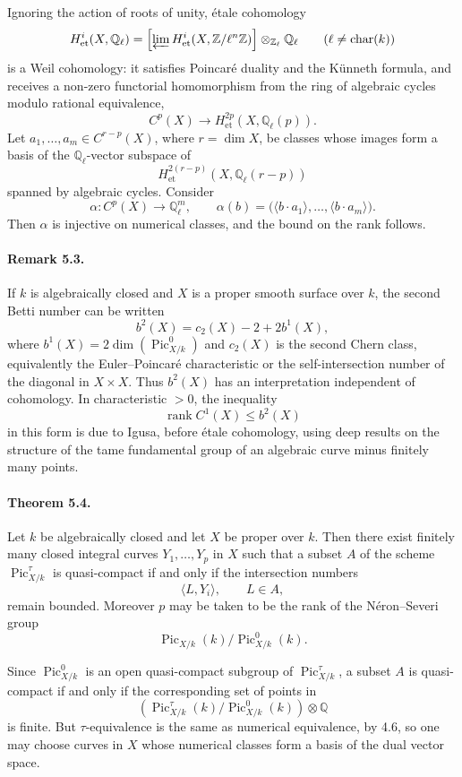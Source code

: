 \documentclass[11pt]{article}
\theoremstyle{plain}
\theoremstyle{definition}
\theoremstyle{remark}
\newcommand{\QQ}{\mathbb Q}
\newcommand{\ZZ}{\mathbb Z}
\DeclareMathOperator{\Pic}{Pic}
\DeclareMathOperator{\rank}{rank}
\newcommand{\longto}{\longrightarrow}
\providecommand{\car}{\operatorname{char}}
\begin{document}
Ignoring the action of roots of unity, étale cohomology
\[
H^i_{\mathrm{et}}(X,\QQ_\ell)=
\left[\varprojlim H^i_{\mathrm{et}}(X,\ZZ/\ell^n\ZZ)\right]\otimes_{\ZZ_\ell}\QQ_\ell
\qquad (\ell\neq\car(k))
\]
is a Weil cohomology: it satisfies Poincaré duality and the Künneth formula, and receives a non-zero functorial homomorphism from the ring of algebraic cycles modulo rational equivalence,
\[
C^p(X)\longto H^{2p}_{\mathrm{et}}(X,\QQ_\ell(p)).
\]
Let $a_1,\ldots,a_m\in C^{r-p}(X)$, where $r=\dim X$, be classes whose images form a basis of the $\QQ_\ell$-vector subspace of
\[
H^{2(r-p)}_{\mathrm{et}}(X,\QQ_\ell(r-p))
\]
spanned by algebraic cycles. Consider
\[
\alpha:C^p(X)\longto \QQ_\ell^m,\qquad
\alpha(b)=\bigl(\langle b\cdot a_1\rangle,\ldots,\langle b\cdot a_m\rangle\bigr).
\]
Then $\alpha$ is injective on numerical classes, and the bound on the rank follows.

\paragraph{Remark 5.3.}
If $k$ is algebraically closed and $X$ is a proper smooth surface over $k$, the second Betti number can be written
\[
b^2(X)=c_2(X)-2+2b^1(X),
\]
where $b^1(X)=2\dim(\Pic^0_{X/k})$ and $c_2(X)$ is the second Chern class, equivalently the Euler--Poincaré characteristic or the self-intersection number of the diagonal in $X\times X$. Thus $b^2(X)$ has an interpretation independent of cohomology. In characteristic $>0$, the inequality
\[
\rank C^1(X)\leq b^2(X)
\]
in this form is due to Igusa, before étale cohomology, using deep results on the structure of the tame fundamental group of an algebraic curve minus finitely many points.

\paragraph{Theorem 5.4.}
Let $k$ be algebraically closed and let $X$ be proper over $k$. Then there exist finitely many closed integral curves $Y_1,\ldots,Y_p$ in $X$ such that a subset $A$ of the scheme $\Pic^\tau_{X/k}$ is quasi-compact if and only if the intersection numbers
\[
\langle L,Y_i\rangle,\qquad L\in A,
\]
remain bounded. Moreover $p$ may be taken to be the rank of the Néron--Severi group
\[
\Pic_{X/k}(k)/\Pic^0_{X/k}(k).
\]

Since $\Pic^0_{X/k}$ is an open quasi-compact subgroup of $\Pic^\tau_{X/k}$, a subset $A$ is quasi-compact if and only if the corresponding set of points in
\[
\left(\Pic^\tau_{X/k}(k)/\Pic^0_{X/k}(k)\right)\otimes\QQ
\]
is finite. But $\tau$-equivalence is the same as numerical equivalence, by 4.6, so one may choose curves in $X$ whose numerical classes form a basis of the dual vector space.
\end{document}
